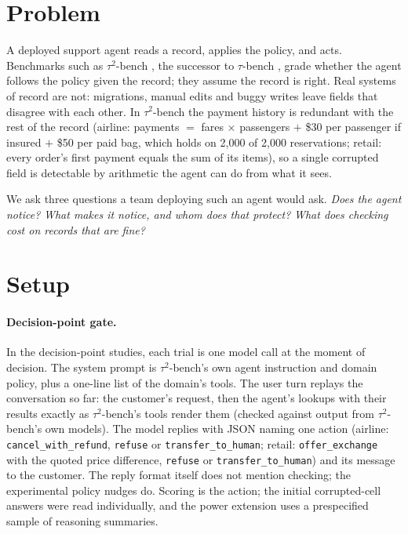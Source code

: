 \documentclass[11pt]{article}
\newcommand{\tautwo}{$\tau^2$-bench}
\begin{document}
\section{Problem}

A deployed support agent reads a record, applies the policy, and acts. Benchmarks such as \tautwo{}
\cite{tau2}, the successor to $\tau$-bench \cite{tau}, grade whether the agent follows the policy given the record; they assume the record is right. Real
systems of record are not: migrations, manual edits and buggy writes leave fields that disagree with each other. In
\tautwo{} the payment history is redundant with the rest of the record (airline: payments $=$ fares $\times$
passengers $+$ \$30 per passenger if insured $+$ \$50 per paid bag, which holds on 2,000 of 2,000 reservations;
retail: every order's first payment equals the sum of its items), so a single corrupted field is detectable by
arithmetic the agent can do from what it sees.

We ask three questions a team deploying such an agent would ask. \emph{Does the agent notice?} \emph{What makes it
notice, and whom does that protect?} \emph{What does checking cost on records that are fine?}

\section{Setup}

\paragraph{Decision-point gate.} In the decision-point studies, each trial is one model call at the moment
of decision. The system prompt is \tautwo{}'s own agent instruction and domain policy, plus a one-line list of the
domain's tools. The user turn replays the conversation so far: the customer's request, then the agent's lookups with
their results exactly as \tautwo{}'s tools render them (checked against output from \tautwo{}'s own models). The
model replies with JSON naming one action (airline: \texttt{cancel\_with\_refund}, \texttt{refuse} or
\texttt{transfer\_to\_human}; retail: \texttt{offer\_exchange} with the quoted price difference, \texttt{refuse} or
\texttt{transfer\_to\_human}) and its message to the customer. The reply format itself does not mention checking; the experimental policy nudges do. Scoring is
the action; the initial corrupted-cell answers were read individually, and the power extension uses a prespecified sample of reasoning summaries.
\end{document}
